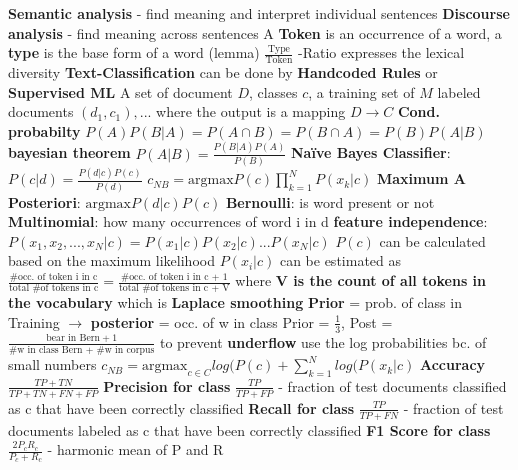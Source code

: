 \documentclass[8pt]{extarticle}
\begin{document}
\begin{multicols*}{3}
\newline \textbf{Semantic analysis} - find meaning and interpret individual sentences
\newline \textbf{Discourse analysis} - find meaning across sentences
A \textbf{Token} is an occurrence of a word, a \textbf{type} is the base form of a word (lemma)
\newline $\frac{\textrm{Type}}{\textrm{Token}}$ -Ratio expresses the lexical diversity
\newline \textbf{Text-Classification} can be done by \textbf{Handcoded Rules} or \textbf{Supervised ML}
\newline A set of document $D$, classes $c$, a training set of $M$ labeled documents $(d_1, c_1),...$ where the output is a mapping $D \rightarrow C$
\newline \textbf{Cond. probabilty} $P(A) P(B|A) = P(A \cap B) = P(B \cap A) = P(B) P(A | B)$
\newline \textbf{bayesian theorem} $ P(A|B) = \frac{P(B|A)P(A)}{P(B)}$
\newline \textbf{Naïve Bayes Classifier}: $P(c|d) = \frac{P(d|c)P(c)}{P(d)}$
\newline $c_{NB} = \textrm{argmax} P(c) \prod_{k=1}^{N} P(x_k | c) $ 
\newline \textbf{Maximum A Posteriori}: $\textrm{argmax} P(d|c) P(c)$
\newline \textbf{Bernoulli}: is word present or not
\newline \textbf{Multinomial}: how many occurrences of word i in d
\newline \textbf{feature independence}: $P(x_1, x_2, ..., x_N | c) = P(x_1 | c) P(x_2 | c) ... P(x_N | c)$
\newline $P(c)$ can be calculated based on the maximum likelihood
\newline $P(x_i | c)$ can be estimated as $\frac{\textrm{\# occ. of token i in c}}{\textrm{total \# of tokens in c}} = \frac{\textrm{\# occ. of token i in c + 1}}{\textrm{total \# of tokens in c + V}}$ where \textbf{V is the count of all tokens in the vocabulary} which is \textbf{Laplace smoothing}
\newline \textbf{Prior} = prob. of class in Training $\rightarrow$ \textbf{posterior} = occ. of w in class
\newline Prior = $\frac{1}{3}$, Post = $\frac{\textrm{bear in Bern} + 1}{\textrm{\#w in class Bern + \#w in corpus}}$
\newline to prevent \textbf{underflow} use the log probabilities bc. of small numbers 
\newline $ c_{NB} = \textrm{argmax}_{c \in C} log(P(c) + \sum_{k = 1}^N log(P(x_k | c) $
\newline \textbf{Accuracy} $\frac{TP + TN}{TP + TN+ FN + FP}$
\newline \textbf{Precision for class} $\frac{TP}{TP + FP}$ - fraction of test documents classified as c that have been correctly classified
\newline \textbf{Recall for class} $\frac{TP}{TP + FN}$ - fraction of test documents labeled as c that have been correctly classified
\newline \textbf{F1 Score for class} $\frac{2 P_c R_c}{P_c + R_c}$ - harmonic mean of P and R


\end{multicols*}
\end{document}
